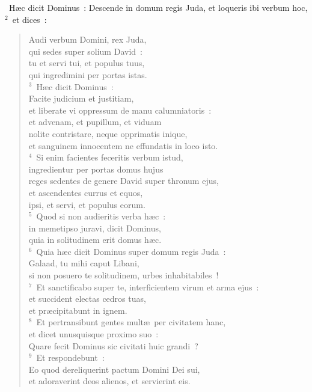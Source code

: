 ~\lettrine[lines=10,image=true,loversize=0.05,lraise=-0.03]{H}{}\ae c dicit Dominus~: Descende in domum regis Juda, et loqueris ibi verbum hoc,
${}^{2}$~et dices~: \begin{flushleft}\begin{verse}Audi verbum Domini, rex Juda,\\ qui sedes super solium David~:\\ tu et servi tui, et populus tuus,\\ qui ingredimini per portas istas.\\
${}^{3}$~H\ae c dicit Dominus~:\\ Facite judicium et justitiam,\\ et liberate vi oppressum de manu calumniatoris~:\\ et advenam, et pupillum, et viduam\\ nolite contristare, neque opprimatis inique,\\ et sanguinem innocentem ne effundatis in loco isto.\\
${}^{4}$~Si enim facientes feceritis verbum istud,\\ ingredientur per portas domus hujus\\ reges sedentes de genere David super thronum ejus,\\ et ascendentes currus et equos,\\ ipsi, et servi, et populus eorum.\\
${}^{5}$~Quod si non audieritis verba h\ae c~:\\ in memetipso juravi, dicit Dominus,\\ quia in solitudinem erit domus h\ae c.\\
${}^{6}$~Quia h\ae c dicit Dominus super domum regis Juda~:\\ Galaad, tu mihi caput Libani,\\ si non posuero te solitudinem, urbes inhabitabiles~!\\
${}^{7}$~Et sanctificabo super te, interficientem virum et arma ejus~:\\ et succident electas cedros tuas,\\ et pr\ae cipitabunt in ignem.\\
${}^{8}$~Et pertransibunt gentes mult\ae\ per civitatem hanc,\\ et dicet unusquisque proximo suo~:\\ Quare fecit Dominus sic civitati huic grandi~?\\
${}^{9}$~Et respondebunt~:\\ Eo quod dereliquerint pactum Domini Dei sui,\\ et adoraverint deos alienos, et servierint eis.\\

\end{verse}
\end{flushleft}
